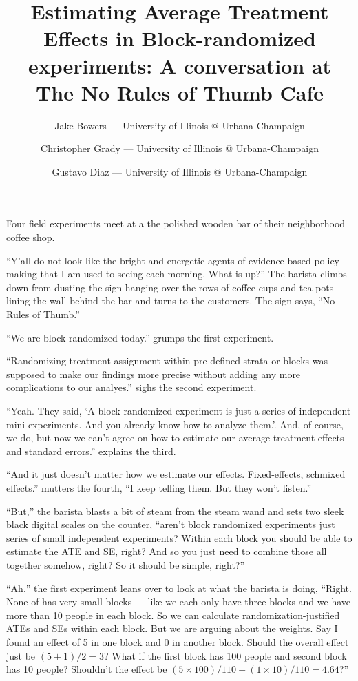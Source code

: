 \documentclass[
]{article}
\title{Estimating Average Treatment Effects in Block-randomized experiments: A conversation at The No Rules of Thumb Cafe}
\author{Jake Bowers --- University of Illinois @ Urbana-Champaign \and Christopher Grady --- University of Illinois @ Urbana-Champaign \and Gustavo Diaz --- University of Illinois @ Urbana-Champaign}
\date{}
\begin{document}
\maketitle

Four field experiments meet at a the polished wooden bar of their neighborhood coffee shop.

``Y'all do not look like the bright and energetic agents of evidence-based
policy making that I am used to seeing each morning. What is up?'' The barista
climbs down from dusting the sign hanging over the rows of coffee cups and tea
pots lining the wall behind the bar and turns to the customers. The sign says,
``No Rules of Thumb.''

``We are block randomized today.'' grumps the first experiment.

``Randomizing treatment assignment within pre-defined strata or blocks was
supposed to make our findings more precise without adding any more
complications to our analyes.'' sighs the second experiment.

``Yeah. They said, `A block-randomized experiment is just a series of
independent mini-experiments. And you already know how to analyze them.'. And,
of course, we do, but now we can't agree on how to estimate our average
treatment effects and standard errors.'' explains the third.

``And it just doesn't matter how we estimate our effects. Fixed-effects,
schmixed effects.'' mutters the fourth, ``I keep telling them. But they won't
listen.''

``But,'' the barista blasts a bit of steam from the steam wand and sets two sleek
black digital scales on the counter, ``aren't block randomized experiments just
series of small independent experiments? Within each block you should be able
to estimate the ATE and SE, right? And so you just need to combine those all
together somehow, right? So it should be simple, right?''

``Ah,'' the first experiment leans over to look at what the barista is doing, ``Right. None of has very small blocks --- like we each only have three blocks and we have more than 10 people in each block. So we can calculate randomization-justified ATEs and SEs within each block. But we are arguing about the weights. Say I found an effect of 5 in one block and 0 in another block. Should the overall effect just be \((5+1)/2=3\)? What if the first block has 100 people and second block has 10 people? Shouldn't the effect be \((5 \times 100)/110 + (1 \times 10)/110 = 4.64\)?''
\end{document}
